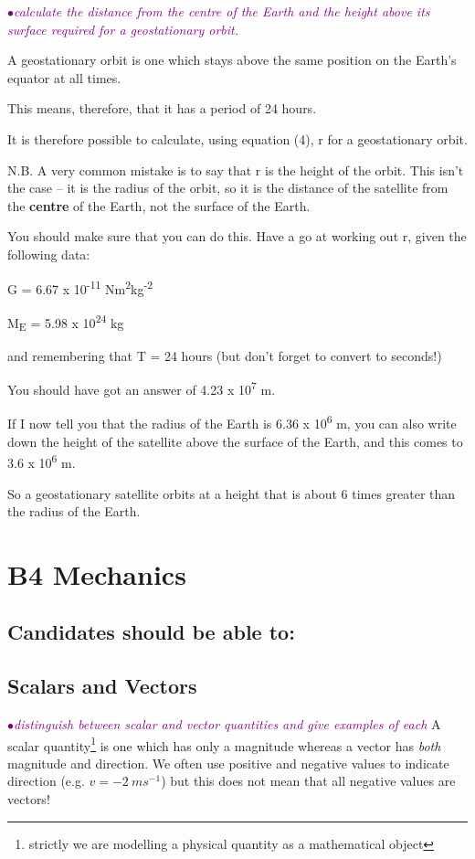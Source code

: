 \documentclass[a4paper,11pt,twoside]{memoir}
\newcounter{spec}[chapter]
\newcommand{\spec}[1]{\Needspace{5\baselineskip}\textcolor{purple}{$\bullet$\hspace{0.5cm}\textit{#1}}}
\begin{document}
\spec{calculate the distance from the centre of the Earth and the height above its surface required for a geostationary orbit.}

A geostationary orbit is one which stays above the same position on the
Earth's equator at all times.

This means, therefore, that it has a period of 24 hours.

It is therefore possible to calculate, using equation (4), r for a
geostationary orbit.

N.B. A very common mistake is to say that r is the height of the orbit.
This isn't the case -- it is the radius of the orbit, so it is the
distance of the satellite from the \textbf{centre} of the Earth, not the
surface of the Earth.

You should make sure that you can do this. Have a go at working out r,
given the following data:

G = 6.67 x 10\textsuperscript{-11}
Nm\textsuperscript{2}kg\textsuperscript{-2}

M\textsubscript{E} = 5.98 x 10\textsuperscript{24} kg

and remembering that T = 24 hours (but don't forget to convert to
seconds!)

You should have got an answer of 4.23 x 10\textsuperscript{7} m.

If I now tell you that the radius of the Earth is
6.36 x 10\textsuperscript{6} m, you can also write down the height of the
satellite above the surface of the Earth, and this comes to
3.6 x 10\textsuperscript{6} m.

So a geostationary satellite orbits at a height that is about 6 times
greater than the radius of the Earth.

\chapter{B4 Mechanics}
\setcounter{spec}{0}

\section*{Candidates should be able to:}

\section{Scalars and Vectors}
\spec{distinguish between scalar and vector quantities and give examples of each}
A scalar quantity\footnote{strictly we are modelling a physical quantity as a mathematical object} is one which has only a magnitude whereas a vector has \emph{both} magnitude and direction. We often use positive and negative values to indicate direction (e.g. $v=-2\ ms^{-1}$) but this does not mean that all negative values are vectors!
\end{document}

